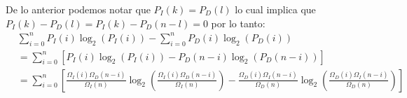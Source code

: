 \begin{answer}
    De lo anterior podemos notar que $P_I(k) = P_D(l)$ lo cual implica que $P_I(k) - P_D(l) = P_I(k) - P_D(n-l) = 0$ por lo tanto:
    \begin{align*}
        &\sum_{i=0}^{n} P_I(i) \log_2(P_I(i)) - \sum_{i=0}^{n} P_D(i) \log_2(P_D(i)) \\
        &= \sum_{i=0}^{n} \left[
            P_I(i) \log_2(P_I(i)) - P_D(n-i) \log_2(P_D(n-i)) 
        \right] \\
        &= \sum_{i=0}^{n} \left[
            \frac{\Omega_I(i) \Omega_D(n-i)}{\Omega_I(n)} \log_2\left(\frac{\Omega_I(i) \Omega_D(n-i)}{\Omega_I(n)}\right) - \frac{\Omega_D(i) \Omega_I(n-i)}{\Omega_D(n)} \log_2\left(\frac{\Omega_D(i) \Omega_I(n-i)}{\Omega_D(n)}\right)
            \right]
    \end{align*}
\end{answer}
